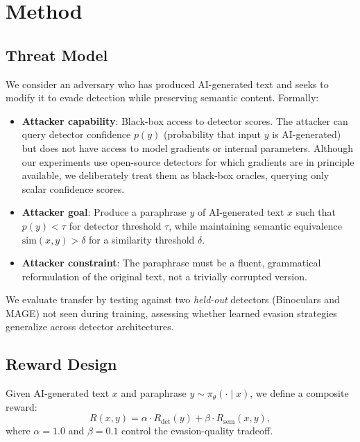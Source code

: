\documentclass[11pt]{article}
\begin{document}
\section{Method}
\label{sec:method}

\subsection{Threat Model}
\label{sec:threat}

We consider an adversary who has produced AI-generated text and seeks to modify it to evade detection while preserving semantic content. Formally:

\begin{itemize}[leftmargin=*,itemsep=2pt]
  \item \textbf{Attacker capability}: Black-box access to detector scores. The attacker can query detector confidence $p(y)$ (probability that input $y$ is AI-generated) but does not have access to model gradients or internal parameters. Although our experiments use open-source detectors for which gradients are in principle available, we deliberately treat them as black-box oracles, querying only scalar confidence scores.
  \item \textbf{Attacker goal}: Produce a paraphrase $y$ of AI-generated text $x$ such that $p(y) < \tau$ for detector threshold $\tau$, while maintaining semantic equivalence $\text{sim}(x, y) > \delta$ for a similarity threshold $\delta$.
  \item \textbf{Attacker constraint}: The paraphrase must be a fluent, grammatical reformulation of the original text, not a trivially corrupted version.
\end{itemize}

We evaluate transfer by testing against two \emph{held-out} detectors (Binoculars and MAGE) not seen during training, assessing whether learned evasion strategies generalize across detector architectures.

\subsection{Reward Design}
\label{sec:reward}

Given AI-generated text $x$ and paraphrase $y \sim \pi_\theta(\cdot \mid x)$, we define a composite reward:
\begin{equation}
  R(x, y) = \alpha \cdot R_{\text{det}}(y) + \beta \cdot R_{\text{sem}}(x, y),
  \label{eq:reward}
\end{equation}
where $\alpha = 1.0$ and $\beta = 0.1$ control the evasion-quality tradeoff.
\end{document}
